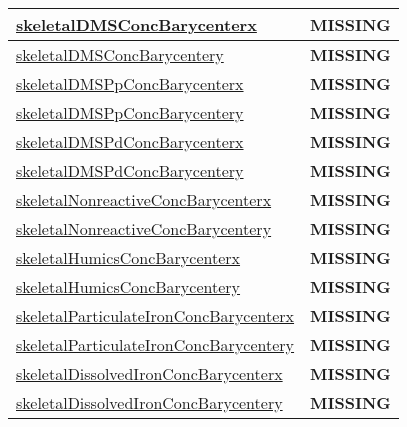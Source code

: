 {\begin{center}
\begin{longtable}{| p{2.0in} | p{4.0in} |}
    \hline
    \hyperref[subsec:var_sec_tracer_barycenter_skeletalDMSConcBarycenterx]{skeletalDMSConcBarycenterx} & {\bf \color{red} MISSING} \\
    \hline
    \hyperref[subsec:var_sec_tracer_barycenter_skeletalDMSConcBarycentery]{skeletalDMSConcBarycentery} & {\bf \color{red} MISSING} \\
    \hline
    \hyperref[subsec:var_sec_tracer_barycenter_skeletalDMSPpConcBarycenterx]{skeletalDMSPpConcBarycenterx} & {\bf \color{red} MISSING} \\
    \hline
    \hyperref[subsec:var_sec_tracer_barycenter_skeletalDMSPpConcBarycentery]{skeletalDMSPpConcBarycentery} & {\bf \color{red} MISSING} \\
    \hline
    \hyperref[subsec:var_sec_tracer_barycenter_skeletalDMSPdConcBarycenterx]{skeletalDMSPdConcBarycenterx} & {\bf \color{red} MISSING} \\
    \hline
    \hyperref[subsec:var_sec_tracer_barycenter_skeletalDMSPdConcBarycentery]{skeletalDMSPdConcBarycentery} & {\bf \color{red} MISSING} \\
    \hline
    \hyperref[subsec:var_sec_tracer_barycenter_skeletalNonreactiveConcBarycenterx]{skeletalNonreactiveConc\-Barycenterx} & {\bf \color{red} MISSING} \\
    \hline
    \hyperref[subsec:var_sec_tracer_barycenter_skeletalNonreactiveConcBarycentery]{skeletalNonreactiveConc\-Barycentery} & {\bf \color{red} MISSING} \\
    \hline
    \hyperref[subsec:var_sec_tracer_barycenter_skeletalHumicsConcBarycenterx]{skeletalHumicsConcBarycenterx} & {\bf \color{red} MISSING} \\
    \hline
    \hyperref[subsec:var_sec_tracer_barycenter_skeletalHumicsConcBarycentery]{skeletalHumicsConcBarycentery} & {\bf \color{red} MISSING} \\
    \hline
    \hyperref[subsec:var_sec_tracer_barycenter_skeletalParticulateIronConcBarycenterx]{skeletalParticulateIronConc\-Barycenterx} & {\bf \color{red} MISSING} \\
    \hline
    \hyperref[subsec:var_sec_tracer_barycenter_skeletalParticulateIronConcBarycentery]{skeletalParticulateIronConc\-Barycentery} & {\bf \color{red} MISSING} \\
    \hline
    \hyperref[subsec:var_sec_tracer_barycenter_skeletalDissolvedIronConcBarycenterx]{skeletalDissolvedIronConc\-Barycenterx} & {\bf \color{red} MISSING} \\
    \hline
    \hyperref[subsec:var_sec_tracer_barycenter_skeletalDissolvedIronConcBarycentery]{skeletalDissolvedIronConc\-Barycentery} & {\bf \color{red} MISSING} \\

\end{longtable}
\end{center}}
